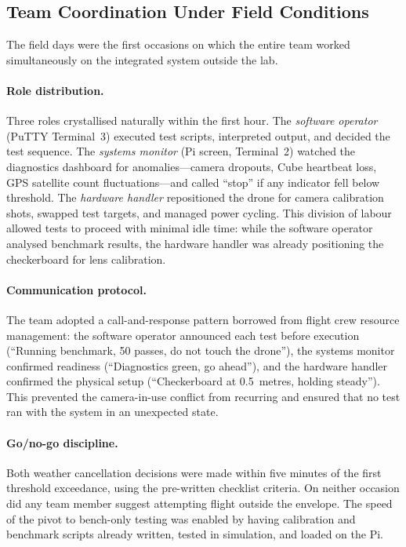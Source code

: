 \subsection{Team Coordination Under Field Conditions}\label{sec:field-team}

The field days were the first occasions on which the entire team worked simultaneously on the integrated system outside the lab.

\paragraph{Role distribution.}
Three roles crystallised naturally within the first hour.  The \emph{software operator} (PuTTY Terminal~3) executed test scripts, interpreted output, and decided the test sequence.  The \emph{systems monitor} (Pi screen, Terminal~2) watched the diagnostics dashboard for anomalies---camera dropouts, Cube heartbeat loss, GPS satellite count fluctuations---and called ``stop'' if any indicator fell below threshold.  The \emph{hardware handler} repositioned the drone for camera calibration shots, swapped test targets, and managed power cycling.  This division of labour allowed tests to proceed with minimal idle time: while the software operator analysed benchmark results, the hardware handler was already positioning the checkerboard for lens calibration.

\paragraph{Communication protocol.}
The team adopted a call-and-response pattern borrowed from flight crew resource management: the software operator announced each test before execution (``Running benchmark, 50 passes, do not touch the drone''), the systems monitor confirmed readiness (``Diagnostics green, go ahead''), and the hardware handler confirmed the physical setup (``Checkerboard at 0.5~metres, holding steady'').  This prevented the camera-in-use conflict from recurring and ensured that no test ran with the system in an unexpected state.

\paragraph{Go/no-go discipline.}
Both weather cancellation decisions were made within five minutes of the first threshold exceedance, using the pre-written checklist criteria.  On neither occasion did any team member suggest attempting flight outside the envelope.  The speed of the pivot to bench-only testing was enabled by having calibration and benchmark scripts already written, tested in simulation, and loaded on the Pi.

